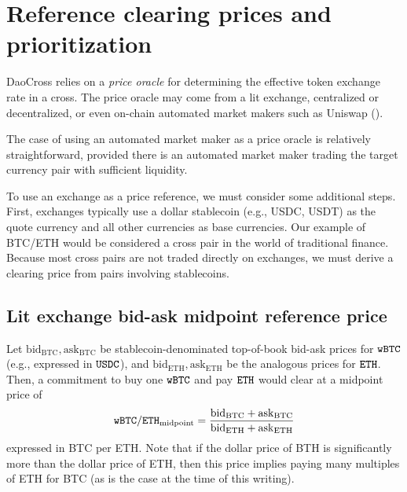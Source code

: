 \documentclass[11pt, reqno]{amsart}
\theoremstyle{definition}
\theoremstyle{remark}
\newcommand{\bidbtc}{\mathrm{bid}_\mathrm{BTC}}
\newcommand{\askbtc}{\mathrm{ask}_\mathrm{BTC}}
\newcommand{\bideth}{\mathrm{bid}_\mathrm{ETH}}
\newcommand{\asketh}{\mathrm{ask}_\mathrm{ETH}}
\newcommand{\BTC}{\textnormal{\texttt{wBTC}}}
\newcommand{\ETH}{\textnormal{\texttt{ETH}}}
\newcommand{\USDC}{\textnormal{\texttt{USDC}}}
\newcommand{\midpoint}{\mathrm{midpoint}}
\begin{document}
%
%


\section{Reference clearing prices and prioritization}
DaoCross relies on a \emph{price oracle} for determining the effective
token exchange rate in a cross. The price oracle may come from a lit
exchange, centralized or decentralized, or even on-chain automated market
makers such as Uniswap (\cite[\S 2.2]{AdZiRo20}).

The case of using an automated market maker as a price oracle is relatively
straightforward, provided there is an automated market maker trading the
target currency pair with sufficient liquidity.

To use an exchange as a price reference, we must consider some additional
steps. First, exchanges typically use a dollar stablecoin (e.g., USDC, USDT) as
the quote currency and all other currencies as base currencies. Our example
of BTC/ETH would be considered a cross pair in the world of traditional
finance. Because most cross pairs are not traded directly on exchanges, we
must derive a clearing price from pairs involving stablecoins.

\subsection{Lit exchange bid-ask midpoint reference price}
Let $\bidbtc, \askbtc$ be stablecoin-denominated top-of-book bid-ask prices
for $\BTC$ (e.g., expressed in $\USDC$), and $\bideth, \asketh$ be the analogous
prices for $\ETH$. Then, a commitment to buy one $\BTC$ and pay $\ETH$ would
clear at a midpoint price of
\[
	\BTC/\ETH_{\midpoint} = \frac{\bidbtc + \askbtc}{\bideth + \asketh}
\]
expressed in BTC per ETH. Note that if the dollar price of BTH is significantly
more than the dollar price of ETH, then this price implies paying many
multiples of ETH for BTC (as is the case at the time of this writing).
\end{document}
